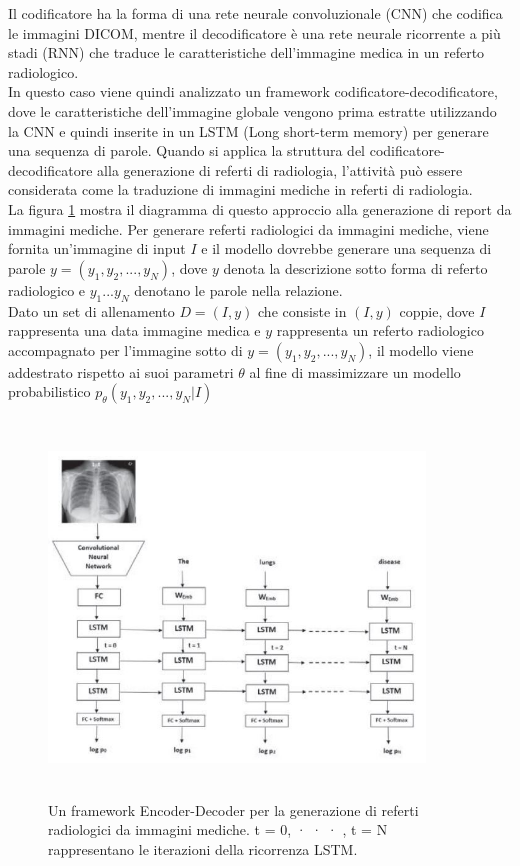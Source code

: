 \documentclass[12pt,a4paper]{report}
\begin{document}
Il codificatore ha la forma di una rete neurale convoluzionale (CNN) che codifica le immagini DICOM, mentre il decodificatore è una rete neurale ricorrente a più stadi (RNN) che traduce le caratteristiche dell'immagine medica in un referto radiologico.\\
In questo caso viene quindi analizzato un framework codificatore-decodificatore, dove le caratteristiche dell'immagine globale vengono prima estratte utilizzando la CNN e quindi inserite in un LSTM (Long short-term memory) per generare una sequenza di parole. Quando si applica la struttura del codificatore-decodificatore alla generazione di referti di radiologia, l'attività può essere considerata come la traduzione di immagini mediche in referti di radiologia.\\
La figura \ref{fig:LSTM} mostra il diagramma di questo approccio alla generazione di report da immagini mediche. Per generare referti radiologici da immagini mediche, viene fornita un'immagine di input $I$ e il modello dovrebbe generare una sequenza di parole $y = (y_1, y_2, . . . ,y_N)$, dove $y$ denota la descrizione sotto forma di referto radiologico e $y_1 . . .y_N$ denotano le parole nella relazione.\\
Dato un set di allenamento $D = (I, y)$ che consiste in $(I, y)$ coppie, dove $I$ rappresenta una data immagine medica e $y$ rappresenta un referto radiologico accompagnato per l'immagine sotto di $y = (y_1, y_2, . . . ,y_N)$, il modello viene addestrato rispetto ai suoi parametri $\theta$ al fine di massimizzare un modello probabilistico $p_{\theta}(y_1, y_2, . . . , y_N|I)$

\begin{figure}[h!]
    \begin{center}
        \includegraphics[width=10cm,height=10cm,keepaspectratio]{LSTM}
    \end{center}
    \caption{Un framework Encoder-Decoder per la generazione di referti radiologici da immagini mediche. t = 0, · · · , t = N rappresentano le iterazioni della ricorrenza LSTM.}
    \label{fig:LSTM}
\end{figure}
\end{document}
